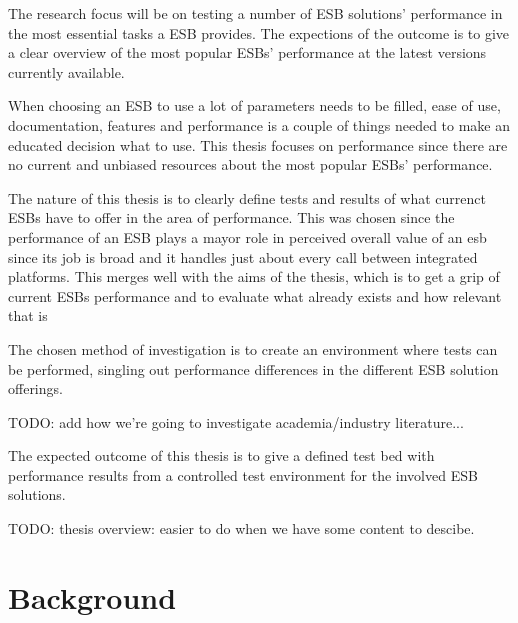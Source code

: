 \documentclass{llncs}
\begin{document}
The research focus will be on testing a number of ESB solutions' performance in the most essential tasks a ESB provides. The expections of the outcome is to give a clear overview of the most popular ESBs' performance at the latest versions currently available.

When choosing an ESB to use a lot of parameters needs to be filled, ease of use, documentation, features and performance is a couple of things needed to make an educated decision what to use. This thesis focuses on performance since there are no current and unbiased resources about the most popular ESBs' performance.

The nature of this thesis is to clearly define tests and results of what currenct ESBs have to offer in the area of performance. This was chosen since the performance of an ESB plays a mayor role in perceived overall value of an esb since its job is broad and it handles just about every call between integrated platforms. This merges well with the aims of the thesis, which is to get a grip of current ESBs performance and to evaluate what already exists and how relevant that is

The chosen method of investigation is to create an environment where tests can be performed, singling out performance differences in the different ESB solution offerings.

TODO: add how we're going to investigate academia/industry literature...

The expected outcome of this thesis is to give a defined test bed with performance results from a controlled test environment for the involved ESB solutions.


TODO: thesis overview: easier to do when we have some content to descibe.

\section{Background}
\label{sec:background}
\end{document}
